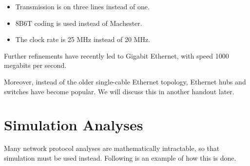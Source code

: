\documentclass[11pt]{article}
\begin{document}
\begin{itemize}
\item Transmission is on three lines instead of one.

\item 8B6T coding is used instead of Machester.

\item The clock rate is 25 MHz instead of 20 MHz.
\end{itemize}

Further refinements have recently led to Gigabit Ethernet, with
speed 1000 megabits per second.

Moreover, instead of the older single-cable Ethernet topology,
Ethernet hubs and switches have become popular.  We will discuss
this in another handout later.  

\section{Simulation Analyses}

Many network protocol analyses are mathematically intractable, so that
simulation must be used instead.  Following is an example of how this
is done.
\end{document}

